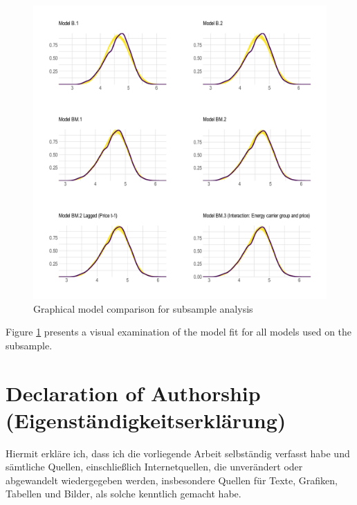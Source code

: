 \documentclass[12pt,twoside]{reedthesis}
\begin{document}
\newpage
\begin{figure}

{\centering \includegraphics[width=1\linewidth]{figure/plot-model-comparison} 

}

\caption{Graphical model comparison for subsample analysis}\label{fig:plot-model-comparison}
\end{figure}
\noindent
Figure \ref{fig:plot-model-comparison} presents a visual examination of the model fit for all models used on the subsample.

\newpage

\onehalfspacing

\hypertarget{declaration-of-authorship-eigenstuxe4ndigkeitserkluxe4rung}{%
\chapter*{Declaration of Authorship (Eigenständigkeitserklärung)}\label{declaration-of-authorship-eigenstuxe4ndigkeitserkluxe4rung}}

Hiermit erkläre ich, dass ich die vorliegende Arbeit selbständig verfasst habe und sämtliche Quellen, einschließlich Internetquellen, die unverändert oder abgewandelt wiedergegeben werden, insbesondere Quellen für Texte, Grafiken, Tabellen und Bilder, als solche kenntlich gemacht habe.
\end{document}
